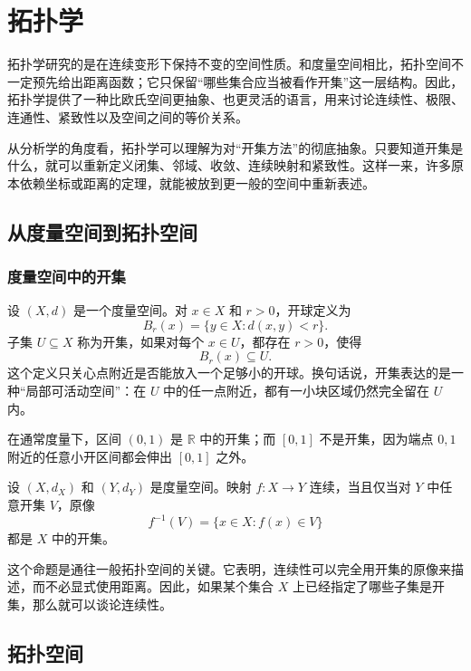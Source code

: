 \chapter{拓扑学}

拓扑学研究的是在连续变形下保持不变的空间性质。和度量空间相比，拓扑空间不一定预先给出距离函数；它只保留“哪些集合应当被看作开集”这一层结构。因此，拓扑学提供了一种比欧氏空间更抽象、也更灵活的语言，用来讨论连续性、极限、连通性、紧致性以及空间之间的等价关系。

从分析学的角度看，拓扑学可以理解为对“开集方法”的彻底抽象。只要知道开集是什么，就可以重新定义闭集、邻域、收敛、连续映射和紧致性。这样一来，许多原本依赖坐标或距离的定理，就能被放到更一般的空间中重新表述。

\section{从度量空间到拓扑空间}

\subsection{度量空间中的开集}

设 $(X,d)$ 是一个度量空间。对 $x\in X$ 和 $r>0$，开球定义为
\[
    B_r(x)=\{y\in X:d(x,y)<r\}.
\]
子集 $U\subseteq X$ 称为开集，如果对每个 $x\in U$，都存在 $r>0$，使得
\[
    B_r(x)\subseteq U.
\]
这个定义只关心点附近是否能放入一个足够小的开球。换句话说，开集表达的是一种“局部可活动空间”：在 $U$ 中的任一点附近，都有一小块区域仍然完全留在 $U$ 内。

\begin{example}
在通常度量下，区间 $(0,1)$ 是 $\mathbb{R}$ 中的开集；而 $[0,1]$ 不是开集，因为端点 $0,1$ 附近的任意小开区间都会伸出 $[0,1]$ 之外。
\end{example}

\begin{proposition}[度量空间中连续性的拓扑形式]
设 $(X,d_X)$ 和 $(Y,d_Y)$ 是度量空间。映射 $f:X\to Y$ 连续，当且仅当对 $Y$ 中任意开集 $V$，原像
\[
    f^{-1}(V)=\{x\in X:f(x)\in V\}
\]
都是 $X$ 中的开集。
\end{proposition}

这个命题是通往一般拓扑空间的关键。它表明，连续性可以完全用开集的原像来描述，而不必显式使用距离。因此，如果某个集合 $X$ 上已经指定了哪些子集是开集，那么就可以谈论连续性。

\section{拓扑空间}

